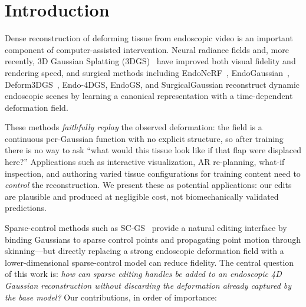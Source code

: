\documentclass[AMA,Times1COL]{WileyNJDv5} %
\begin{document}
\renewcommand\thefootnote{\fnsymbol{footnote}}
\setcounter{footnote}{1}

\section{Introduction}\label{sec1}

Dense reconstruction of deforming tissue from endoscopic video is an important component of computer-assisted intervention. Neural radiance fields and, more recently, 3D Gaussian Splatting (3DGS)~\cite{kerbl2023gaussian} have improved both visual fidelity and rendering speed, and surgical methods including EndoNeRF~\cite{wang2022endonerf}, EndoGaussian~\cite{liu2024endogaussian}, Deform3DGS~\cite{yang2024deform3dgs}, Endo-4DGS, EndoGS, and SurgicalGaussian reconstruct dynamic endoscopic scenes by learning a canonical representation with a time-dependent deformation field.

These methods \emph{faithfully replay} the observed deformation: the field is a continuous per-Gaussian function with no explicit structure, so after training there is no way to ask ``what would this tissue look like if that flap were displaced here?'' Applications such as interactive visualization, AR re-planning, what-if inspection, and authoring varied tissue configurations for training content need to \emph{control} the reconstruction. We present these as potential applications: our edits are plausible and produced at negligible cost, not biomechanically validated predictions.

Sparse-control methods such as SC-GS~\cite{huang2024scgs} provide a natural editing interface by binding Gaussians to sparse control points and propagating point motion through skinning---but directly replacing a strong endoscopic deformation field with a lower-dimensional sparse-control model can reduce fidelity. The central question of this work is: \emph{how can sparse editing handles be added to an endoscopic 4D Gaussian reconstruction without discarding the deformation already captured by the base model?} Our contributions, in order of importance:
\end{document}
